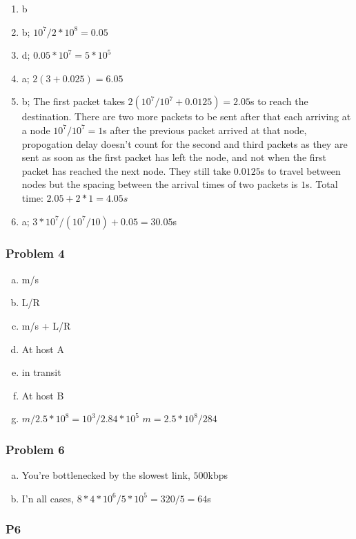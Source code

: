 \documentclass[11pt]{article}
\begin{document}
\begin{enumerate}
    \item b
    \item b; $10^7/2*10^8 = 0.05$
    \item d; $0.05 * 10^7 = 5*10^5$
    \item a; $2(3 + 0.025) = 6.05$
    \item b; The first packet takes $2 (10^7/10^7 + 0.0125) = 2.05$s to reach the destination. There are two more packets to be sent after that each arriving at a node $10^7/10^7 = 1$s after the previous packet arrived at that node, propogation delay doesn't count for the second and third packets as they are sent as soon as the first packet has left the node, and not when the first packet has reached the next node. They still take $0.0125$s to travel between nodes but the spacing between the arrival times of two packets is $1$s. Total time: $2.05 + 2 * 1 = 4.05s$ 
    \item a; $3*10^7/(10^7/10) + 0.05 = 30.05$s
\end{enumerate}

\subsubsection{Problem 4}

\begin{enumerate}[(a)]
    \item m/s
    \item L/R
    \item m/s + L/R
    \item At host A
    \item in transit
    \item At host B
    \item $m/2.5*10^8 = 10^3/2.84*10^5$ $m = 2.5*10^8/284$
\end{enumerate}

\subsubsection{Problem 6}

\begin{enumerate}[(a)]
    \item You're bottlenecked by the slowest link, $500$kbps
    \item I'n all cases, $8*4*10^6/5*10^5 = 320/5 = 64$s
\end{enumerate}

\subsubsection{P6}
\end{document}
